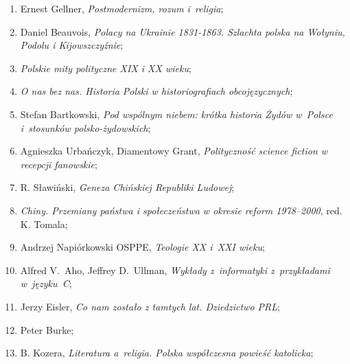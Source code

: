 \documentclass[a4paper,11pt]{article}
\begin{document}
\begin{enumerate}
\item Ernest Gellner, \textit{Postmodernizm, rozum i~religia};



\item Daniel Beauvois, \textit{Polacy na Ukrainie 1831-1863. Szlachta
    polska na Wołyniu, Podolu i Kijowszczyźnie};



\item \textit{Polskie mity polityczne XIX i XX wieku};



\item \textit{O nas bez nas. Historia Polski w historiografiach
    obcojęzycznych};



\item Stefan Bartkowski, \textit{Pod wspólnym niebem: krótka historia
    Żydów w~Polsce i~stosunków polsko-żydowskich};



\item Agnieszka Urbańczyk, Diamentowy Grant, \textit{Polityczność
    science fiction w recepcji fanowskie};



\item R. Sławiński, \textit{Geneza Chińskiej Republiki Ludowej};



\item \textit{Chiny. Przemiany państwa i społeczeństwa w okresie reform
    1978--2000}, red. K. Tomala;



\item Andrzej Napiórkowski OSPPE, \textit{Teologie XX i~XXI wieku};



\item Alfred V.~Aho, Jeffrey D.~Ullman, \textit{Wykłady z~informatyki
    z~przykładami w~języku~C};



\item Jerzy Eisler, \textit{Co nam zostało z tamtych lat. Dziedzictwo
    PRL};



\item Peter Burke;



\item B. Kozera, \textit{Literatura a~religia. Polska współczesna
    powieść katolicka};




\end{enumerate}
\end{document}
